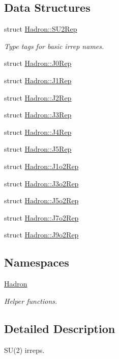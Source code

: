 \subsection*{Data Structures}
\begin{DoxyCompactItemize}
\item 
struct \mbox{\hyperlink{structHadron_1_1SU2Rep}{Hadron\+::\+S\+U2\+Rep}}
\begin{DoxyCompactList}\small\item\em Type tags for basic irrep names. \end{DoxyCompactList}\item 
struct \mbox{\hyperlink{structHadron_1_1J0Rep}{Hadron\+::\+J0\+Rep}}
\item 
struct \mbox{\hyperlink{structHadron_1_1J1Rep}{Hadron\+::\+J1\+Rep}}
\item 
struct \mbox{\hyperlink{structHadron_1_1J2Rep}{Hadron\+::\+J2\+Rep}}
\item 
struct \mbox{\hyperlink{structHadron_1_1J3Rep}{Hadron\+::\+J3\+Rep}}
\item 
struct \mbox{\hyperlink{structHadron_1_1J4Rep}{Hadron\+::\+J4\+Rep}}
\item 
struct \mbox{\hyperlink{structHadron_1_1J5Rep}{Hadron\+::\+J5\+Rep}}
\item 
struct \mbox{\hyperlink{structHadron_1_1J1o2Rep}{Hadron\+::\+J1o2\+Rep}}
\item 
struct \mbox{\hyperlink{structHadron_1_1J3o2Rep}{Hadron\+::\+J3o2\+Rep}}
\item 
struct \mbox{\hyperlink{structHadron_1_1J5o2Rep}{Hadron\+::\+J5o2\+Rep}}
\item 
struct \mbox{\hyperlink{structHadron_1_1J7o2Rep}{Hadron\+::\+J7o2\+Rep}}
\item 
struct \mbox{\hyperlink{structHadron_1_1J9o2Rep}{Hadron\+::\+J9o2\+Rep}}
\end{DoxyCompactItemize}
\subsection*{Namespaces}
\begin{DoxyCompactItemize}
\item 
 \mbox{\hyperlink{namespaceHadron}{Hadron}}
\begin{DoxyCompactList}\small\item\em Helper functions. \end{DoxyCompactList}\end{DoxyCompactItemize}


\subsection{Detailed Description}
S\+U(2) irreps. 

